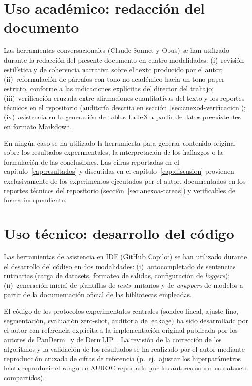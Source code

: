 \section{Uso académico: redacción del documento}
\label{sec:anexod-academico}

Las herramientas conversacionales (Claude Sonnet y Opus) se han
utilizado durante la redacción del presente documento en cuatro
modalidades: (i)~revisión estilística y de coherencia narrativa
sobre el texto producido por el autor;
(ii)~reformulación de párrafos con tono no académico hacia un
tono paper estricto, conforme a las indicaciones explícitas del
director del trabajo;
(iii)~verificación cruzada entre afirmaciones cuantitativas del
texto y los reportes técnicos en el repositorio (auditoría
descrita en sección~\ref{sec:anexod-verificacion});
(iv)~asistencia en la generación de tablas LaTeX a partir de
datos preexistentes en formato Markdown.

En ningún caso se ha utilizado la herramienta para generar
contenido original sobre los resultados experimentales, la
interpretación de los hallazgos o la formulación de las
conclusiones. Las cifras reportadas en el
capítulo~\ref{cap:resultados} y discutidas en el
capítulo~\ref{cap:discusion} provienen exclusivamente de los
experimentos ejecutados por el autor, documentados en los
reportes técnicos del repositorio
(sección~\ref{sec:anexoa-tareas}) y verificables de forma
independiente.

\section{Uso técnico: desarrollo del código}
\label{sec:anexod-tecnico}

Las herramientas de asistencia en IDE (GitHub Copilot) se han
utilizado durante el desarrollo del código en dos modalidades:
(i)~autocompletado de sentencias rutinarias (carga de datasets,
formateo de salidas, configuración de \emph{loggers});
(ii)~generación inicial de plantillas de \emph{tests} unitarios y
de \emph{wrappers} de modelos a partir de la documentación
oficial de las bibliotecas empleadas.

El código de los protocolos experimentales centrales
(sondeo lineal, ajuste fino, segmentación, evaluación zero-shot,
auditoría de leakage) ha sido desarrollado por el autor con
referencia explícita a la implementación original publicada por
los autores de PanDerm~\cite{panderm2025} y de
DermLIP~\cite{derm1m}. La revisión de la corrección de los
algoritmos y la validación de los resultados se ha realizado por
el autor mediante reproducción cruzada de cifras de referencia
(p.~ej.~ajustar los hiperparámetros hasta reproducir el rango de
AUROC reportado por los autores sobre los datasets compartidos).

